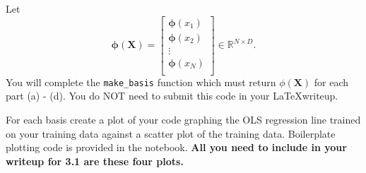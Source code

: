 \documentclass[submit]{harvardml}
\begin{document}
\begin{problem}
\begin{enumerate}
Let 
$$ \mathbf{\phi}(\mathbf{X}) = 
\begin{bmatrix} 
\mathbf{\phi}(x_1) \\
\mathbf{\phi}(x_2) \\
\vdots \\
\mathbf{\phi}(x_N) \\
\end{bmatrix} \in \mathbb{R}^{N\times D}.$$
You will complete the \verb|make_basis| function which must return
$\phi(\mathbf{X})$ for each part 
(a) - (d). You do NOT need to submit this
code in your \LaTeX writeup.


For each basis create a plot of your code graphing the OLS 
regression line trained on your training data against a 
scatter plot of the training data. Boilerplate plotting code
is provided in the notebook. \textbf{All you need to include 
in your writeup for 3.1 are these four plots.}
\vspace{1em}
\end{enumerate}
\end{problem}
\end{document}
